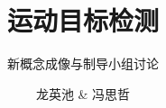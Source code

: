 \documentclass[UTF8]{ctexbeamer}
\title{运动目标检测}
\subtitle{新概念成像与制导小组讨论}
\author{龙英池 \& 冯思哲}
\institute{HIT}
\begin{document}
\frame{\titlepage}



\end{document}
